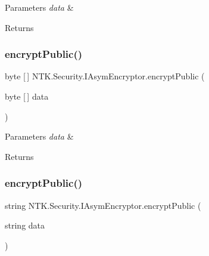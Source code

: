 \begin{DoxyParams}{Parameters}
{\em data} & \\
\hline
\end{DoxyParams}
\begin{DoxyReturn}{Returns}

\end{DoxyReturn}
\mbox{\label{interface_n_t_k_1_1_security_1_1_i_asym_encryptor_acbbe8a40bde117549ab7ff8bdc15dbd9}} 
\subsubsection{\texorpdfstring{encryptPublic()}{encryptPublic()}\hspace{0.1cm}{\footnotesize\ttfamily [1/2]}}
{\footnotesize\ttfamily byte \mbox{[}$\,$\mbox{]} N\+T\+K.\+Security.\+I\+Asym\+Encryptor.\+encrypt\+Public (\begin{DoxyParamCaption}\item[{byte \mbox{[}$\,$\mbox{]}}]{data }\end{DoxyParamCaption})}






\begin{DoxyParams}{Parameters}
{\em data} & \\
\hline
\end{DoxyParams}
\begin{DoxyReturn}{Returns}

\end{DoxyReturn}
\mbox{\label{interface_n_t_k_1_1_security_1_1_i_asym_encryptor_a0df0e0bf48b8df3425b5de820ef08ffa}} 
\subsubsection{\texorpdfstring{encryptPublic()}{encryptPublic()}\hspace{0.1cm}{\footnotesize\ttfamily [2/2]}}
{\footnotesize\ttfamily string N\+T\+K.\+Security.\+I\+Asym\+Encryptor.\+encrypt\+Public (\begin{DoxyParamCaption}\item[{string}]{data }\end{DoxyParamCaption})}






